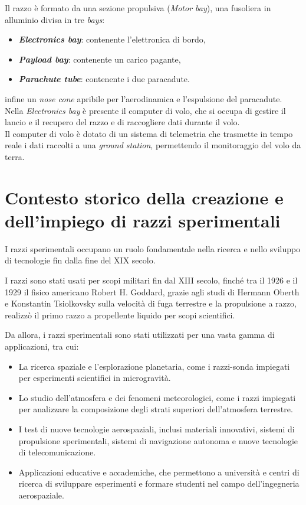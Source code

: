 \documentclass[12pt,a4paper,twoside]{book}
\begin{document}
Il razzo è formato da una sezione propulsiva (\emph{Motor bay}), una fusoliera
in alluminio divisa in tre \emph{bays}: 
\begin{itemize}
    \item \textbf{\emph{Electronics bay}}: contenente l'elettronica di bordo, 
    \item \textbf{\emph{Payload bay}}: contenente un carico pagante,
    \item \textbf{\emph{Parachute tube}}: contenente i due paracadute. 
\end{itemize} 
infine un \emph{nose cone} apribile per l'aerodinamica e l'espulsione del paracadute. \\

Nella \emph{Electronics bay}
è presente il computer di volo, che si occupa di
gestire il lancio e il recupero del razzo e di raccogliere dati durante il volo. \\
Il computer di volo è dotato di un sistema di telemetria che trasmette in tempo
reale i dati raccolti a una \emph{ground station}, permettendo il monitoraggio
del volo da terra.

\section{Contesto storico della creazione e dell'impiego di razzi sperimentali}
I razzi sperimentali occupano un ruolo fondamentale nella ricerca e nello
sviluppo di tecnologie fin dalla fine del XIX secolo.

I razzi sono stati usati per scopi militari fin dal XIII secolo, finch\'e tra il
1926 e il 1929 il fisico americano Robert H. Goddard, grazie agli studi di
Hermann Oberth e Konstantin Tsiolkovsky sulla velocità di fuga terrestre e la
propulsione a razzo, realizz\`o il primo razzo a propellente liquido per scopi
scientifici\cite{seibert2006history}.

Da allora, i razzi sperimentali sono stati utilizzati per una vasta gamma di
applicazioni, tra cui:
\begin{itemize}
    \item La ricerca spaziale e l’esplorazione planetaria, come i razzi-sonda 
          impiegati per esperimenti scientifici in microgravità.
    \item Lo studio dell’atmosfera e dei fenomeni meteorologici, come i razzi
          impiegati per analizzare la composizione degli strati superiori
          dell’atmosfera terrestre.
    \item I test di nuove tecnologie aerospaziali, inclusi materiali innovativi, 
          sistemi di propulsione sperimentali, sistemi di navigazione autonoma e 
          nuove tecnologie di telecomunicazione.
    \item Applicazioni educative e accademiche, che permettono a università e
          centri di ricerca di sviluppare esperimenti e formare studenti nel campo
          dell’ingegneria aerospaziale.
\end{itemize}
\end{document}
